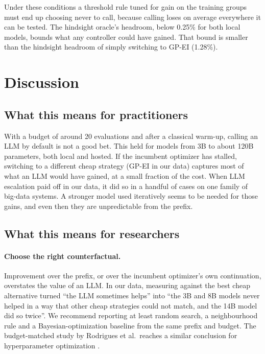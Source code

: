 Under these conditions a threshold rule tuned for gain on the training groups must end up choosing never to call, because calling loses on average everywhere it can be tested. The hindsight oracle's headroom, below 0.25\% for both local models, bounds what any controller could have gained. That bound is smaller than the hindsight headroom of simply switching to GP-EI (1.28\%).

\section{Discussion}

\subsection{What this means for practitioners}

With a budget of around 20 evaluations and after a classical warm-up, calling an LLM by default is not a good bet. This held for models from 3B to about 120B parameters, both local and hosted. If the incumbent optimizer has stalled, switching to a different cheap strategy (GP-EI in our data) captures most of what an LLM would have gained, at a small fraction of the cost. When LLM escalation paid off in our data, it did so in a handful of cases on one family of big-data systems. A stronger model used iteratively seems to be needed for those gains, and even then they are unpredictable from the prefix.

\subsection{What this means for researchers}

\paragraph{Choose the right counterfactual.} Improvement over the prefix, or over the incumbent optimizer's own continuation, overstates the value of an LLM. In our data, measuring against the best cheap alternative turned ``the LLM sometimes helps'' into ``the 3B and 8B models never helped in a way that other cheap strategies could not match, and the 14B model did so twice''. We recommend reporting at least random search, a neighbourhood rule and a Bayesian-optimization baseline from the same prefix and budget. The budget-matched study by Rodrigues et al.\ reaches a similar conclusion for hyperparameter optimization \cite{rodrigues2026worth}.

